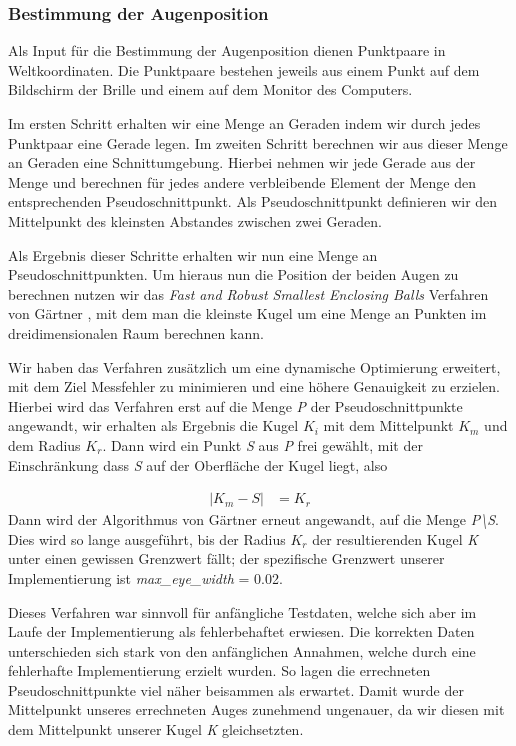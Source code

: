 \subsubsection{Bestimmung der Augenposition}
\label{sec:Augenposition}
Als Input für die Bestimmung der Augenposition dienen Punktpaare in Weltkoordinaten. Die Punktpaare bestehen jeweils aus einem Punkt auf dem Bildschirm der Brille und einem auf dem Monitor des Computers.

Im ersten Schritt erhalten wir eine Menge an Geraden indem wir durch jedes Punktpaar eine Gerade legen. Im zweiten Schritt berechnen wir aus dieser Menge an Geraden eine Schnittumgebung. Hierbei nehmen wir jede Gerade aus der Menge und berechnen für jedes andere verbleibende Element der Menge den entsprechenden Pseudoschnittpunkt. Als Pseudoschnittpunkt definieren wir den      Mittelpunkt des kleinsten Abstandes zwischen zwei Geraden.

Als Ergebnis dieser Schritte erhalten wir nun eine Menge an Pseudoschnittpunkten. Um hieraus nun die Position der beiden Augen zu berechnen nutzen wir das \emph{Fast and Robust Smallest Enclosing Balls} Verfahren von Gärtner \cite{gaertner}, mit dem man die kleinste Kugel um eine Menge an Punkten im dreidimensionalen Raum berechnen kann.

Wir haben das Verfahren zusätzlich um eine dynamische Optimierung erweitert, mit dem Ziel
Messfehler zu minimieren und eine höhere Genauigkeit zu erzielen.\\ 

Hierbei wird das Verfahren erst auf die Menge \emph{P} der Pseudoschnittpunkte angewandt, wir erhalten als Ergebnis die Kugel $K_i$ mit  dem Mittelpunkt $K_m$ und dem Radius $K_r$. Dann wird ein Punkt \emph{S} aus \emph{P} frei gewählt, mit der Einschränkung dass \emph{S} auf der Oberfläche der Kugel liegt, also

\begin{align}
| K_m - S | &= K_r
\end{align} Dann wird der Algorithmus von Gärtner erneut angewandt, auf die Menge \emph{P\textbackslash S}. Dies wird so lange ausgeführt, bis
der Radius $K_r$ der resultierenden Kugel \emph{K} unter einen gewissen Grenzwert fällt; der spezifische Grenzwert unserer Implementierung ist \emph{max\_eye\_width} = 0.02.

Dieses Verfahren war sinnvoll für anfängliche Testdaten, welche sich aber im Laufe der Implementierung als fehlerbehaftet erwiesen. Die korrekten Daten unterschieden sich stark von den anfänglichen Annahmen, welche durch eine fehlerhafte Implementierung erzielt wurden. So lagen die errechneten Pseudoschnittpunkte viel näher beisammen als erwartet. Damit wurde der Mittelpunkt unseres errechneten Auges zunehmend ungenauer, da wir diesen mit dem Mittelpunkt
unserer Kugel \emph{K} gleichsetzten.

